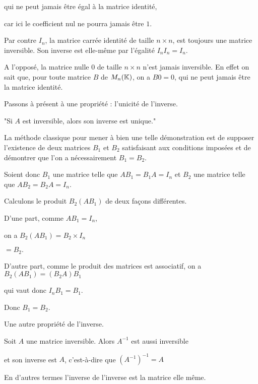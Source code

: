 \change
qui ne peut jamais être égal à la matrice identité,

car ici le coefficient nul ne pourra jamais être $1$.

\change

Par contre $I_{n}$, la matrice carrée identité de taille $n\times n$,
est toujours une matrice inversible. Son inverse est elle-même par l'égalité $I_{n}I_{n}=I_{n}$.
 
\change
A l'opposé, la matrice nulle $0$ de taille $n \times n$ n'est jamais inversible. 
En effet on sait que, pour toute matrice $B$ de $M_{n}(\mathbb{K})$, on a $B0=0$, qui ne peut jamais être la matrice identité.


\diapo

Passons à présent à une propriété  :  l'unicité de l'inverse.

"Si $A$ est inversible, alors son inverse est unique."

\change
La méthode classique pour mener à bien une telle démonstration est de 
supposer l'existence de deux matrices $B_{1}$ et $B_{2}$ 
satisfaisant aux conditions imposées et de démontrer que l'on a nécessairement $B_{1}=B_{2}$.

Soient donc $B_{1}$ une matrice telle que $AB_{1}=B_{1}A=I_{n}$ et $B_{2}$ une matrice telle que 
$AB_{2}=B_{2}A=I_{n}$.

\change
Calculons le produit $B_{2}(AB_{1})$ de deux façons différentes.

\change
D'une part, comme $AB_{1}=I_{n}$, 

on a  $B_{2}(AB_{1})=B_{2}\times I_n$

\change
$=B_2.$

\change
D'autre part, comme le produit des matrices est associatif, on a 
$B_{2}(AB_{1})=(B_{2}A)B_{1}$

\change
qui vaut donc $I_{n}B_{1}=B_{1}$.

\change
Donc $B_{1}=B_{2}$. 


\diapo

Une autre propriété de l'inverse.

Soit $A$ une matrice inversible. Alors $A^{-1}$ est aussi inversible 

\change
et son inverse est $A$, c'est-à-dire que $(A^{-1})^{-1}=A$

En d'autres termes l'inverse de l'inverse est la matrice elle même.
% 


